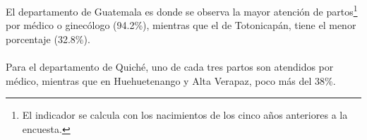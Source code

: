 El departamento de Guatemala  es donde se observa la mayor atención de partos\footnote{El indicador se calcula con los nacimientos de los cinco años anteriores a la encuesta.} por médico o ginecólogo (94.2\%), mientras que  el de Totonicapán, tiene el menor porcentaje (32.8\%).\\\\ 
Para el departamento de Quiché, uno de cada tres partos son atendidos por médico, mientras que en Huehuetenango y Alta Verapaz, poco más del 38\%.